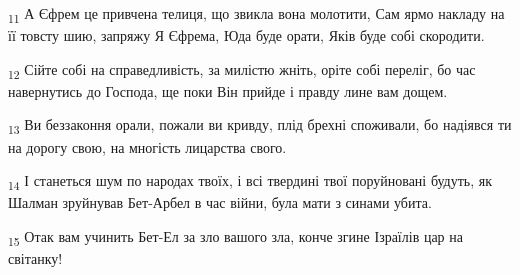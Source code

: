 \begin{tcolorbox}
\textsubscript{11} А Єфрем це привчена телиця, що звикла вона молотити, Сам ярмо накладу на її товсту шию, запряжу Я Єфрема, Юда буде орати, Яків буде собі скородити.
\end{tcolorbox}
\begin{tcolorbox}
\textsubscript{12} Сійте собі на справедливість, за милістю жніть, оріте собі переліг, бо час навернутись до Господа, ще поки Він прийде і правду лине вам дощем.
\end{tcolorbox}
\begin{tcolorbox}
\textsubscript{13} Ви беззаконня орали, пожали ви кривду, плід брехні споживали, бо надіявся ти на дорогу свою, на многість лицарства свого.
\end{tcolorbox}
\begin{tcolorbox}
\textsubscript{14} І станеться шум по народах твоїх, і всі твердині твої поруйновані будуть, як Шалман зруйнував Бет-Арбел в час війни, була мати з синами убита.
\end{tcolorbox}
\begin{tcolorbox}
\textsubscript{15} Отак вам учинить Бет-Ел за зло вашого зла, конче згине Ізраїлів цар на світанку!
\end{tcolorbox}
